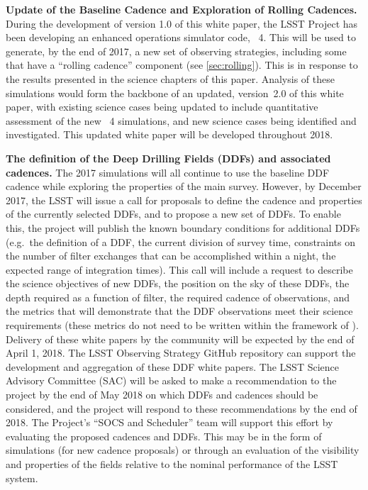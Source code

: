 \begin{description}

\item{\textbf{Update of the Baseline Cadence and Exploration of Rolling
Cadences.}} During the development of version 1.0 of this white paper, the LSST
Project has been developing an enhanced operations simulator code,
\OpSim~4. This will be used to generate, by the end of 2017, a new set of
observing strategies, including some that have a ``rolling cadence''
component (see \autoref{sec:rolling}). This is in response to the results presented in the science
chapters of this paper. Analysis of these simulations would form the
backbone of an updated, version~2.0 of this white paper, with existing
science cases being updated to include quantitative assessment of the
new \OpSim~4 simulations, and new science cases being identified and
investigated. This updated white paper will be developed throughout 2018.

\item{\textbf{The definition of the Deep Drilling Fields (DDFs) and
associated cadences.}} The 2017 simulations will all continue
to use the baseline DDF cadence while exploring the properties of the main survey. However, by December 2017, the LSST
will issue a call for proposals to define the cadence and properties of
the currently selected DDFs, and to propose a new set of DDFs. To enable
this, the project will publish the known boundary conditions for
additional DDFs (e.g.\ the definition of a DDF, the current division of
survey time, constraints on the number of filter exchanges that can be
accomplished within a night, the expected range of integration times).
This call will include a request to describe the science objectives of
new DDFs, the position on the sky of these DDFs, the depth required as a
function of filter, the required cadence of observations, and the
metrics that will demonstrate that the DDF observations meet their
science requirements (these metrics do not need to be written within the
framework of \MAF). Delivery of these white papers by the community will
be expected by the end of April 1, 2018.  The LSST Observing Strategy GitHub
repository can support the development and aggregation of these DDF
white papers. The LSST Science Advisory Committee (SAC) will be asked to make a recommendation to the
project by the end of May 2018 on which DDFs and cadences should be
considered, and the project will respond to these recommendations by
the end of 2018. The Project's ``SOCS and Scheduler'' team will support
this effort by evaluating the proposed cadences and DDFs. This may be in
the form of simulations (for new cadence proposals) or through an
evaluation of the visibility and properties of the fields relative to
the nominal performance of the LSST system.


\end{description}
